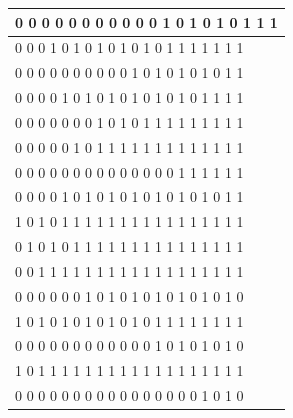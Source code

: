 \documentclass[11pt, a4paper]{article}
\begin{document}
\begin{enumerate}
\begin{table}[http]
\begin{tabular}{|l|}
			0     0     0     0     0     0     0     0     0     0     0     1     0     1     0     1     0     1     1     1 \\ \hline
			0     0     0     1     0     1     0     1     0     1     0     1     0     1     1     1     1     1     1     1 \\ \hline
			0     0     0     0     0     0     0     0     0     0     1     0     1     0     1     0     1     0     1     1 \\ \hline
			0     0     0     0     1     0     1     0     1     0     1     0     1     0     1     0     1     1     1     1 \\ \hline
			0     0     0     0     0     0     0     1     0     1     0     1     1     1     1     1     1     1     1     1 \\ \hline
			0     0     0     0     0     1     0     1     1     1     1     1     1     1     1     1     1     1     1     1 \\ \hline
			0     0     0     0     0     0     0     0     0     0     0     0     0     0     1     1     1     1     1     1 \\ \hline
			0     0     0     0     1     0     1     0     1     0     1     0     1     0     1     0     1     0     1     1 \\ \hline
			1     0     1     0     1     1     1     1     1     1     1     1     1     1     1     1     1     1     1     1 \\ \hline
			0     1     0     1     0     1     1     1     1     1     1     1     1     1     1     1     1     1     1     1 \\ \hline
			0     0     1     1     1     1     1     1     1     1     1     1     1     1     1     1     1     1     1     1 \\ \hline
			0     0     0     0     0     0     1     0     1     0     1     0     1     0     1     0     1     0     1     0 \\ \hline
			1     0     1     0     1     0     1     0     1     0     1     0     1     1     1     1     1     1     1     1 \\ \hline
			0     0     0     0     0     0     0     0     0     0     0     0     1     0     1     0     1     0     1     0 \\ \hline
			1     0     1     1     1     1     1     1     1     1     1     1     1     1     1     1     1     1     1     1 \\ \hline
			0     0     0     0     0     0     0     0     0     0     0     0     0     0     0     0     1     0     1     0 \\ \hline

\end{tabular}
\end{table}
\end{enumerate}
\end{document}
